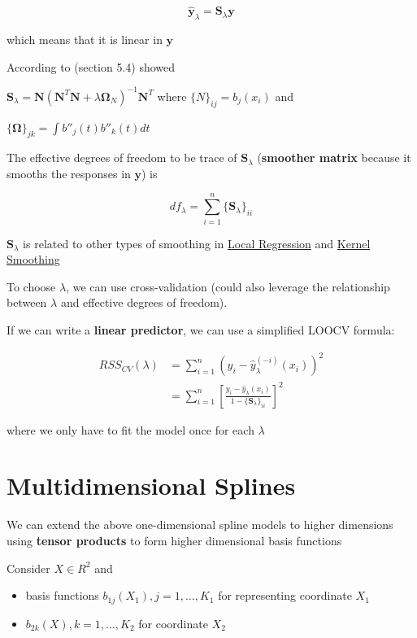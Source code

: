 \documentclass[
]{book}
\begin{document}
\[
\hat{\mathbf{y}}_\lambda = \mathbf{S}_\lambda \mathbf{y}
\]

which means that it is linear in \(\mathbf{y}\)

According to \citet{hastie2001a} (section 5.4) showed

\(\mathbf{S}_\lambda = \mathbf{N}(\mathbf{N}^T\mathbf{N}+ \lambda \mathbf{\Omega}_N)^{-1} \mathbf{N}^T\) where \(\{N\}_{ij} = b_j (x_i)\) and

\(\{\mathbf{\Omega}\}_{jk} = \int b''_j (t) b''_k(t)dt\)

The effective degrees of freedom to be trace of \(\mathbf{S}_\lambda\) (\textbf{smoother matrix} because it smooths the responses in \(\mathbf{y}\)) is

\[
df_\lambda = \sum_{i=1}^n \{\mathbf{S}_\lambda\}_{ii}
\]

\(\mathbf{S}_\lambda\) is related to other types of smoothing in \protect\hyperlink{local-regression}{Local Regression} and \protect\hyperlink{kernel-smoothing}{Kernel Smoothing}

To choose \(\lambda\), we can use cross-validation (could also leverage the relationship between \(\lambda\) and effective degrees of freedom).

If we can write a \textbf{linear predictor}, we can use a simplified LOOCV formula:

\[
\begin{aligned}
RSS_{CV}(\lambda)&= \sum_{i=1}^n(y_i - \hat{y}_\lambda^{(-i)}(x_i))^2 \\
&= \sum_{i=1}^n[\frac{y_i - \hat{y}_\lambda(x_i)}{1-\{\mathbf{S}_\lambda\}_{ii}}]^2
\end{aligned}
\]

where we only have to fit the model once for each \(\lambda\)

\hypertarget{multidimensional-splines}{%
\section{Multidimensional Splines}\label{multidimensional-splines}}

We can extend the above one-dimensional spline models to higher dimensions using \textbf{tensor products} to form higher dimensional basis functions

Consider \(X \in R^2\) and

\begin{itemize}
\item
  basis functions \(b_{1j}(X_1), j = 1, \dots, K_1\) for representing coordinate \(X_1\)
\item
  \(b_{2k}(X), k = 1, \dots, K_2\) for coordinate \(X_2\)
\end{itemize}
\end{document}

